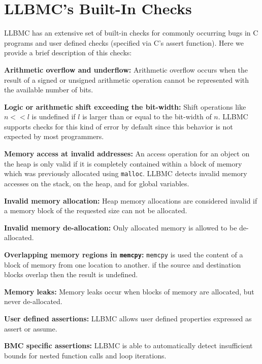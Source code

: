 \documentclass[14pt]{article}
\begin{document}
{\section{LLBMC's Built-In Checks}\label{LLBMC?s Built-In Checks}
LLBMC has an extensive set of built-in checks for commonly occurring bugs in C programs and user defined checks (specified via C's assert function). Here we provide a brief description of this checks:
\begin{inparaenum}
  \item \textbf{Arithmetic overflow and underflow:} Arithmetic overflow occurs when the result of a signed or unsigned arithmetic operation cannot be represented with the available number of bits.
\item \textbf{Logic or arithmetic shift exceeding the bit-width:} Shift operations like  \(n << l\)  is undefined if  \(l \) is larger than or equal to the bit-width of  \(n\). LLBMC supports checks for this kind of error by default since this behavior is not expected by most programmers.
\item \textbf{Memory access at invalid addresses:} An access operation for an object on the heap is only valid if it is completely contained within a block of memory which was previously allocated using \texttt{malloc}. LLBMC detects invalid memory accesses on the stack, on the heap, and for global variables.
\item \textbf{Invalid memory allocation:} Heap memory allocations are considered invalid if a memory block of the requested size can not be allocated. 
\item \textbf{Invalid memory de-allocation:} Only allocated memory is allowed to be de-allocated.
\item \textbf{Overlapping memory regions in \texttt{memcpy}:}  \texttt{memcpy} is used the content of a block of memory from one location to another. if the source and destination blocks overlap then the result is undefined.
\item \textbf{Memory leaks:} Memory leaks occur when blocks of memory are allocated, but never de-allocated.
\item \textbf{User defined assertions:} LLBMC allows user defined properties expressed as assert or assume. 
\item \textbf{BMC specific assertions:} LLBMC is able to automatically detect insufficient bounds for nested function calls and loop iterations.

\end{inparaenum}


}
\end{document}

